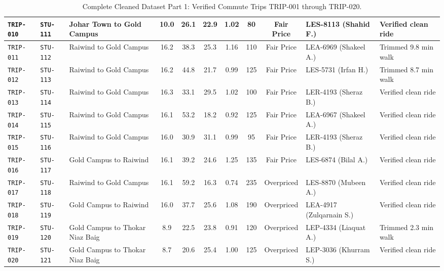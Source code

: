 \documentclass[10pt, a4paper]{article}
\begin{document}
\begin{table}[h!]
\begin{tabularx}{\textwidth}{|l|l|l|c|c|c|c|c|c|p{2.4cm}|X|}
\rowcolor{lightgray}\texttt{TRIP-010} & \texttt{STU-111} & Johar Town to Gold Campus & 10.0 & 26.1 & 22.9 & 1.02 & 80 & Fair Price & LES-8113 (Shahid F.) & Verified clean ride \\ \hline
\rowcolor{white}\texttt{TRIP-011} & \texttt{STU-112} & Raiwind to Gold Campus & 16.2 & 38.3 & 25.3 & 1.16 & 110 & Fair Price & LEA-6969 (Shakeel A.) & Trimmed 9.8 min walk \\ \hline
\rowcolor{lightgray}\texttt{TRIP-012} & \texttt{STU-113} & Raiwind to Gold Campus & 16.2 & 44.8 & 21.7 & 0.99 & 125 & Fair Price & LES-5731 (Irfan H.) & Trimmed 8.7 min walk \\ \hline
\rowcolor{white}\texttt{TRIP-013} & \texttt{STU-114} & Raiwind to Gold Campus & 16.3 & 33.1 & 29.5 & 1.02 & 100 & Fair Price & LER-4193 (Sheraz B.) & Verified clean ride \\ \hline
\rowcolor{lightgray}\texttt{TRIP-014} & \texttt{STU-115} & Raiwind to Gold Campus & 16.1 & 53.2 & 18.2 & 0.92 & 125 & Fair Price & LEA-6967 (Shakeel A.) & Verified clean ride \\ \hline
\rowcolor{white}\texttt{TRIP-015} & \texttt{STU-116} & Raiwind to Gold Campus & 16.0 & 30.9 & 31.1 & 0.99 & 95 & Fair Price & LER-4193 (Sheraz B.) & Verified clean ride \\ \hline
\rowcolor{lightgray}\texttt{TRIP-016} & \texttt{STU-117} & Gold Campus to Raiwind & 16.1 & 39.2 & 24.6 & 1.25 & 135 & Fair Price & LES-6874 (Bilal A.) & Verified clean ride \\ \hline
\rowcolor{white}\texttt{TRIP-017} & \texttt{STU-118} & Raiwind to Gold Campus & 16.1 & 59.2 & 16.3 & 0.74 & 235 & Overpriced & LES-8870 (Mubeen A.) & Verified clean ride \\ \hline
\rowcolor{lightgray}\texttt{TRIP-018} & \texttt{STU-119} & Gold Campus to Raiwind & 16.0 & 37.7 & 25.6 & 1.08 & 190 & Overpriced & LEA-4917 (Zulqarnain S.) & Verified clean ride \\ \hline
\rowcolor{white}\texttt{TRIP-019} & \texttt{STU-120} & Gold Campus to Thokar Niaz Baig & 8.9 & 22.5 & 23.8 & 0.91 & 120 & Overpriced & LEP-4334 (Liaquat A.) & Trimmed 2.3 min walk \\ \hline
\rowcolor{lightgray}\texttt{TRIP-020} & \texttt{STU-121} & Gold Campus to Thokar Niaz Baig & 8.7 & 20.6 & 25.4 & 1.00 & 125 & Overpriced & LEP-3036 (Khurram S.) & Verified clean ride \\ \hline
\end{tabularx}
\caption{\small Complete Cleaned Dataset Part 1: Verified Commute Trips TRIP-001 through TRIP-020.}
\end{table}
\end{document}
